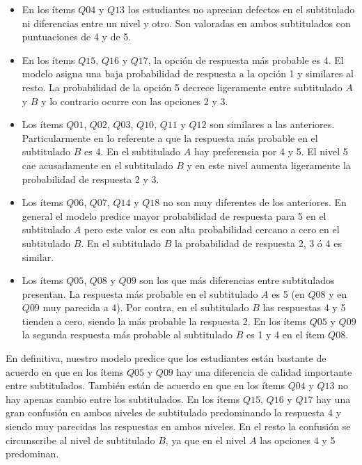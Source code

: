 \documentclass[
  12pt,
  a4paper,
  extrafontsizes,
  onecolumn,
  openright,
  table]{memoir}
\begin{document}
\begin{itemize}
\item
  En los ítems \(Q04\) y \(Q13\) los estudiantes no aprecian defectos en
  el subtitulado ni diferencias entre un nivel y otro. Son valoradas en
  ambos subtitulados con puntuaciones de 4 y de 5.
\item
  En los ítems \(Q15\), \(Q16\) y \(Q17\), la opción de respuesta más
  probable es 4. El modelo asigna una baja probabilidad de respuesta a
  la opción 1 y similares al resto. La probabilidad de la opción 5
  decrece ligeramente entre subtitulado \(A\) y \(B\) y lo contrario
  ocurre con las opciones 2 y 3.
\item
  Los ítems \(Q01\), \(Q02\), \(Q03\), \(Q10\), \(Q11\) y \(Q12\) son
  similares a las anteriores. Particularmente en lo referente a que la
  respuesta más probable en el subtitulado \(B\) es 4. En el subtitulado
  \(A\) hay preferencia por 4 y 5. El nivel 5 cae acusadamente en el
  subtitulado \(B\) y en este nivel aumenta ligeramente la probabilidad
  de respuesta 2 y 3.
\item
  Los ítems \(Q06\), \(Q07\), \(Q14\) y \(Q18\) no son muy diferentes de
  los anteriores. En general el modelo predice mayor probabilidad de
  respuesta para 5 en el subtitulado \(A\) pero este valor es con alta
  probabilidad cercano a cero en el subtitulado \(B\). En el subtitulado
  \(B\) la probabilidad de respuesta 2, 3 ó 4 es similar.
\item
  Los ítems \(Q05\), \(Q08\) y \(Q09\) son los que más diferencias entre
  subtitulados presentan. La respuesta más probable en el subtitulado
  \(A\) es 5 (en \(Q08\) y en \(Q09\) muy parecida a 4). Por contra, en
  el subtitulado \(B\) las respuestas 4 y 5 tienden a cero, siendo la
  más probable la respuesta 2. En los ítems \(Q05\) y \(Q09\) la segunda
  respuesta más probable al subtitulado \(B\) es 1 y 4 en el ítem
  \(Q08\).
\end{itemize}

En definitiva, nuestro modelo predice que los estudiantes están bastante
de acuerdo en que en los ítems \(Q05\) y \(Q09\) hay una diferencia de
calidad importante entre subtitulados. También están de acuerdo en que
en los ítems \(Q04\) y \(Q13\) no hay apenas cambio entre los
subtitulados. En los ítems \(Q15\), \(Q16\) y \(Q17\) hay una gran
confusión en ambos niveles de subtitulado predominando la respuesta 4 y
siendo muy parecidas las respuestas en ambos niveles. En el resto la
confusión se circunscribe al nivel de subtitulado \(B\), ya que en el
nivel \(A\) las opciones 4 y 5 predominan.
\end{document}
